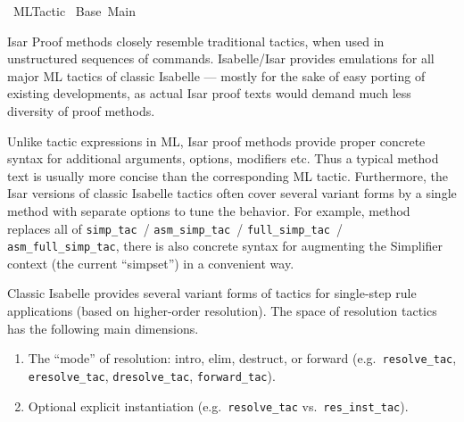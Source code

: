 %
\begin{isabellebody}%
\def\isabellecontext{ML{\isaliteral{5F}{\isacharunderscore}}Tactic}%
%
\isadelimtheory
%
\endisadelimtheory
%
\isatagtheory
{}\isamarkupfalse%
\ ML{}Tactic\isanewline
{}\ Base\ Main\isanewline
{}%
\endisatagtheory
{\isafoldtheory}%
%
\isadelimtheory
%
\endisadelimtheory
%
\isamarkuptrue%
%
\begin{isamarkuptext}%
Isar Proof methods closely resemble traditional tactics, when used
  in unstructured sequences of \hyperlink{command.apply}{\mbox{}} commands.
  Isabelle/Isar provides emulations for all major ML tactics of
  classic Isabelle --- mostly for the sake of easy porting of existing
  developments, as actual Isar proof texts would demand much less
  diversity of proof methods.

  Unlike tactic expressions in ML, Isar proof methods provide proper
  concrete syntax for additional arguments, options, modifiers etc.
  Thus a typical method text is usually more concise than the
  corresponding ML tactic.  Furthermore, the Isar versions of classic
  Isabelle tactics often cover several variant forms by a single
  method with separate options to tune the behavior.  For example,
  method \hyperlink{method.simp}{\mbox{}} replaces all of \verb|simp_tac|~/ \verb|asm_simp_tac|~/ \verb|full_simp_tac|~/ \verb|asm_full_simp_tac|, there
  is also concrete syntax for augmenting the Simplifier context (the
  current ``simpset'') in a convenient way.%
\end{isamarkuptext}%
\isamarkuptrue%
%
\isamarkuptrue%
%
\begin{isamarkuptext}%
Classic Isabelle provides several variant forms of tactics for
  single-step rule applications (based on higher-order resolution).
  The space of resolution tactics has the following main dimensions.

  \begin{enumerate}

  \item The ``mode'' of resolution: intro, elim, destruct, or forward
  (e.g.\ \verb|resolve_tac|, \verb|eresolve_tac|, \verb|dresolve_tac|,
  \verb|forward_tac|).

  \item Optional explicit instantiation (e.g.\ \verb|resolve_tac| vs.\
  \verb|res_inst_tac|).


\end{enumerate}
\end{isamarkuptext}
\end{isabellebody}
